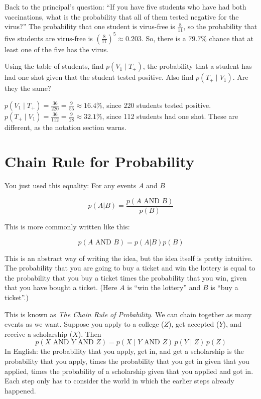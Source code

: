 Back to the principal's question: ``If you have five students who have had
both vaccinations, what is the probability that all of them tested
negative for the virus?'' The probability that one student is virus-free
is $\frac{8}{11}$, so the probability that five students are virus-free
is $\left(\frac{8}{11}\right)^5 \approx 0.203$.  So, there is a $79.7\%$ chance
that at least one of the five has the virus.

\begin{Exercise}[label=cp1, title=Conditional probability from the table]
Using the table of students, find $p(V_1 \mid T_{+})$, the probability that a student has had one shot given that the student tested positive. Also find $p(T_{+} \mid V_1)$. Are they the same?
\end{Exercise}
\begin{Answer}[ref=cp1]
$p(V_1 \mid T_{+}) = \frac{36}{220} = \frac{9}{55} \approx 16.4\%$, since 220 students tested positive. $p(T_{+} \mid V_1) = \frac{36}{112} = \frac{9}{28} \approx 32.1\%$, since 112 students had one shot. These are different, as the notation section warns.
\end{Answer}

\section{Chain Rule for Probability}
You just used this equality: For any events $A$ and $B$

$$p(A | B) = \frac{p(A \text{ AND } B)}{p(B)}$$

This is more commonly written like this:

$$p(A \text{ AND } B) = p(A | B) p(B)$$

This is an abstract way of writing the idea, but the idea itself
is pretty intuitive. The probability that you are going to buy a ticket
and win the lottery is equal to the probability that you buy a ticket
times the probability that you win, given that you have bought a ticket.
(Here $A$ is ``win the lottery'' and $B$ is ``buy a ticket''.)

This is known as \textit{The Chain Rule of Probability}. We can
chain together as many events as we want. Suppose you apply to a college
($Z$), get accepted ($Y$), and receive a scholarship ($X$). Then
$$p(X \text{ AND } Y \text{ AND } Z) = p(X \mid Y \text{ AND } Z)\, p(Y \mid Z)\, p(Z)$$
In English: the probability that you apply, get in, and get a scholarship
is the probability that you apply, times the probability that you get in
given that you applied, times the probability of a scholarship given that
you applied and got in. Each step only has to consider the world in which
the earlier steps already happened.


